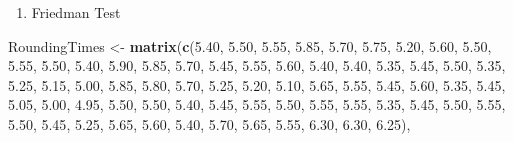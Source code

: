 \documentclass[
]{book}
\newenvironment{Shaded}{\begin{snugshade}}{\end{snugshade}}
\newcommand{\FloatTok}[1]{\textcolor[rgb]{0.00,0.00,0.81}{#1}}
\newcommand{\FunctionTok}[1]{\textcolor[rgb]{0.13,0.29,0.53}{\textbf{#1}}}
\newcommand{\NormalTok}[1]{#1}
\newcommand{\OtherTok}[1]{\textcolor[rgb]{0.56,0.35,0.01}{#1}}
\providecommand{\tightlist}{%
  \setlength{\itemsep}{0pt}\setlength{\parskip}{0pt}}
\begin{document}
\begin{enumerate}
\def\labelenumi{\alph{enumi}.}
\setcounter{enumi}{3}
\tightlist
\item
  Friedman Test
\end{enumerate}

\begin{Shaded}
\begin{Highlighting}[]
\NormalTok{RoundingTimes }\OtherTok{\textless{}{-}}
\FunctionTok{matrix}\NormalTok{(}\FunctionTok{c}\NormalTok{(}\FloatTok{5.40}\NormalTok{, }\FloatTok{5.50}\NormalTok{, }\FloatTok{5.55}\NormalTok{,}
         \FloatTok{5.85}\NormalTok{, }\FloatTok{5.70}\NormalTok{, }\FloatTok{5.75}\NormalTok{,}
         \FloatTok{5.20}\NormalTok{, }\FloatTok{5.60}\NormalTok{, }\FloatTok{5.50}\NormalTok{,}
         \FloatTok{5.55}\NormalTok{, }\FloatTok{5.50}\NormalTok{, }\FloatTok{5.40}\NormalTok{,}
         \FloatTok{5.90}\NormalTok{, }\FloatTok{5.85}\NormalTok{, }\FloatTok{5.70}\NormalTok{,}
         \FloatTok{5.45}\NormalTok{, }\FloatTok{5.55}\NormalTok{, }\FloatTok{5.60}\NormalTok{,}
         \FloatTok{5.40}\NormalTok{, }\FloatTok{5.40}\NormalTok{, }\FloatTok{5.35}\NormalTok{,}
         \FloatTok{5.45}\NormalTok{, }\FloatTok{5.50}\NormalTok{, }\FloatTok{5.35}\NormalTok{,}
         \FloatTok{5.25}\NormalTok{, }\FloatTok{5.15}\NormalTok{, }\FloatTok{5.00}\NormalTok{,}
         \FloatTok{5.85}\NormalTok{, }\FloatTok{5.80}\NormalTok{, }\FloatTok{5.70}\NormalTok{,}
         \FloatTok{5.25}\NormalTok{, }\FloatTok{5.20}\NormalTok{, }\FloatTok{5.10}\NormalTok{,}
         \FloatTok{5.65}\NormalTok{, }\FloatTok{5.55}\NormalTok{, }\FloatTok{5.45}\NormalTok{,}
         \FloatTok{5.60}\NormalTok{, }\FloatTok{5.35}\NormalTok{, }\FloatTok{5.45}\NormalTok{,}
         \FloatTok{5.05}\NormalTok{, }\FloatTok{5.00}\NormalTok{, }\FloatTok{4.95}\NormalTok{,}
         \FloatTok{5.50}\NormalTok{, }\FloatTok{5.50}\NormalTok{, }\FloatTok{5.40}\NormalTok{,}
         \FloatTok{5.45}\NormalTok{, }\FloatTok{5.55}\NormalTok{, }\FloatTok{5.50}\NormalTok{,}
         \FloatTok{5.55}\NormalTok{, }\FloatTok{5.55}\NormalTok{, }\FloatTok{5.35}\NormalTok{,}
         \FloatTok{5.45}\NormalTok{, }\FloatTok{5.50}\NormalTok{, }\FloatTok{5.55}\NormalTok{,}
         \FloatTok{5.50}\NormalTok{, }\FloatTok{5.45}\NormalTok{, }\FloatTok{5.25}\NormalTok{,}
         \FloatTok{5.65}\NormalTok{, }\FloatTok{5.60}\NormalTok{, }\FloatTok{5.40}\NormalTok{,}
         \FloatTok{5.70}\NormalTok{, }\FloatTok{5.65}\NormalTok{, }\FloatTok{5.55}\NormalTok{,}
         \FloatTok{6.30}\NormalTok{, }\FloatTok{6.30}\NormalTok{, }\FloatTok{6.25}\NormalTok{),}

\end{Highlighting}
\end{Shaded}
\end{document}
